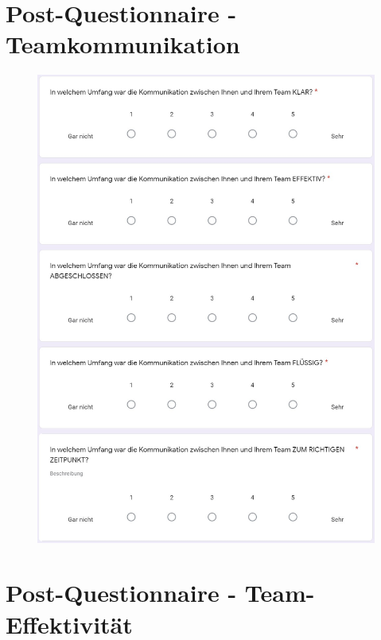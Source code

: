 \documentclass[a4paper,11pt]{article}%
\renewcommand{\\}{\vspace*{0.5\baselineskip} \newline}
\begin{document}
\newpage
\section{Post-Questionnaire - Teamkommunikation}	
\label{Post-Questionnaire - Teamkommunikation}	

\begin{figure}[H]
	\centering
		\begin{footnotesize}
			\includegraphics[scale=0.4]{Abbildungen/Fragebogen/Post-Questionnaire/PQKQ1}
		\end{footnotesize}
	\end{figure}	

\newpage
\section{Post-Questionnaire - Team-Effektivität}	
\label{Post-Questionnaire - Team-Effektivität}	
\end{document}
